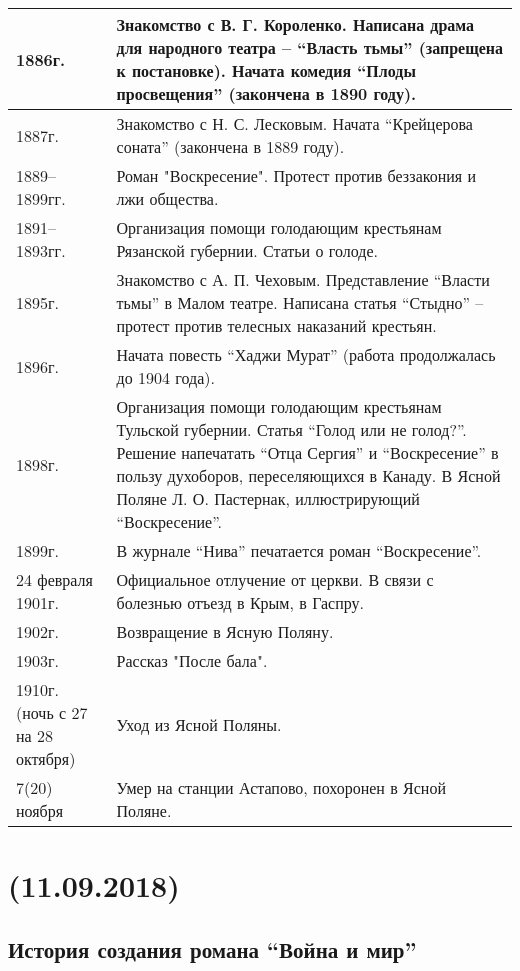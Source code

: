 \documentclass{article}
\begin{document}
\begin{longtable}[c]{|p{3cm}|p{8cm}|}
  \hline
  1886г. & Знакомство с В. Г. Короленко.
  Написана драма для народного театра – ``Власть тьмы'' (запрещена к постановке).
  Начата комедия ``Плоды просвещения'' (закончена в 1890 году).\\
  \hline
  1887г. & Знакомство с Н. С. Лесковым.
  Начата ``Крейцерова соната'' (закончена в 1889 году).\\
  \hline
  1889–1899гг. & Роман "Воскресение". Протест против беззакония и лжи общества.\\
  \hline
  1891–1893гг. & Организация помощи голодающим крестьянам Рязанской губернии. Статьи о голоде.\\
  \hline
  1895г. & Знакомство с А. П. Чеховым. Представление ``Власти тьмы'' в Малом театре.
  Написана статья ``Стыдно'' – протест против телесных наказаний крестьян.\\
  \hline
  1896г. & Начата повесть ``Хаджи Мурат'' (работа продолжалась до 1904 года).\\
  \hline
  1898г. & Организация помощи голодающим крестьянам Тульской губернии. Статья ``Голод или не голод?''.
  Решение напечатать ``Отца Сергия'' и ``Воскресение'' в пользу духоборов, переселяющихся в Канаду.
  В Ясной Поляне Л. О. Пастернак, иллюстрирующий ``Воскресение''.\\
  \hline
  1899г. & В журнале ``Нива'' печатается роман ``Воскресение''.\\
  \hline
  24 февраля 1901г. & Официальное отлучение от церкви. В связи с болезнью отъезд в Крым, в Гаспру.\\
  \hline
  1902г. & Возвращение в Ясную Поляну.\\
  \hline
  1903г. & Рассказ "После бала".\\
  \hline
  1910г. (ночь с 27 на 28 октября)  & Уход из Ясной Поляны.\\
  \hline
  7(20) ноября & Умер на станции Астапово, похоронен в Ясной Поляне.\\
  \bottomrule
\end{longtable}

\newpage

\noindent\makebox[\linewidth]{\rule{\paperwidth}{0.4pt}}
\section{(11.09.2018)}
\noindent\makebox[\linewidth]{\rule{\paperwidth}{0.4pt}}
\subsection{История создания романа ``Война и мир''}
\end{document}
